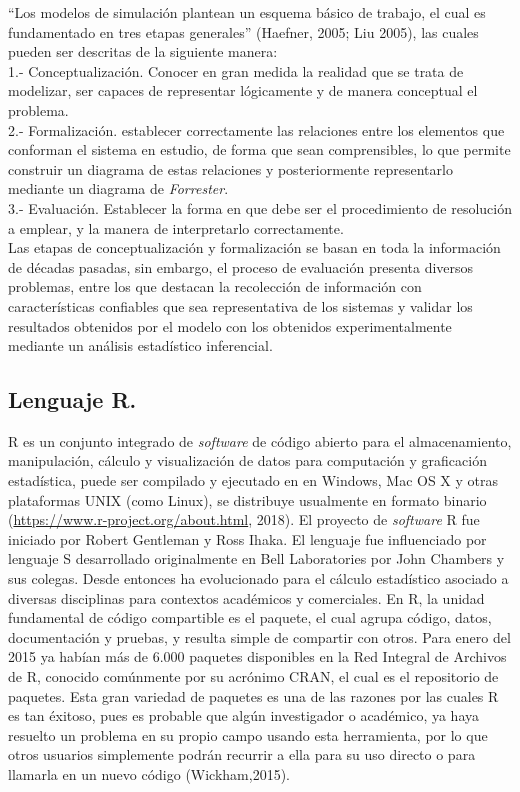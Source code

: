 ``Los modelos de simulaci\'on plantean un esquema b\'asico de trabajo, el cual es fundamentado en tres etapas generales'' (Haefner, 2005; Liu 2005), las cuales pueden ser descritas de la siguiente manera:\\

1.- Conceptualizaci\'on. Conocer en gran medida la realidad que se trata de modelizar, ser capaces de representar l\'ogicamente y de manera conceptual el problema. \\

2.- Formalizaci\'on. establecer correctamente las relaciones entre los elementos que conforman el sistema en estudio, de forma que sean comprensibles, lo que permite construir un diagrama de estas relaciones y posteriormente representarlo mediante un diagrama de \textit{Forrester}.\\

3.- Evaluaci\'on. Establecer la forma en que debe ser el procedimiento de resoluci\'on a emplear, y la manera de interpretarlo correctamente.\\


Las etapas de conceptualizaci\'on y formalizaci\'on se basan en toda la informaci\'on de d\'ecadas pasadas, sin embargo, el proceso de evaluaci\'on presenta diversos problemas, entre los que destacan la recolecci\'on de informaci\'on con caracter\'isticas confiables que sea representativa de los sistemas y validar los resultados obtenidos por el modelo con los obtenidos experimentalmente mediante un an\'alisis estad\'istico inferencial.


\subsection{Lenguaje R.}

R es un conjunto  integrado de \textit{software} de c\'odigo abierto para el almacenamiento, manipulaci\'on, c\'alculo y visualizaci\'on de datos para computaci\'on y graficaci\'on estad\'istica, puede ser compilado y ejecutado en  en Windows, Mac OS X y otras  plataformas UNIX (como Linux), se distribuye usualmente en formato binario (\url{https://www.r-project.org/about.html}, 2018). El proyecto de \emph{software} R fue iniciado por Robert Gentleman y Ross Ihaka. El lenguaje fue influenciado por  lenguaje S desarrollado originalmente en Bell Laboratories por John Chambers y sus colegas. Desde entonces ha evolucionado  para el c\'alculo estad\'istico asociado a diversas disciplinas para contextos acad\'emicos y comerciales. En R, la unidad fundamental de c\'odigo compartible es el paquete, el cual agrupa c\'odigo, datos, documentaci\'on y pruebas, y resulta simple de compartir con otros. Para enero del 2015 ya hab\'ian m\'as de 6.000 paquetes disponibles en la Red Integral de Archivos de R, conocido com\'unmente por su acr\'onimo CRAN, el cual es el repositorio de paquetes. Esta gran variedad de paquetes es una de las razones por las cuales R es tan \'exitoso, pues es probable que alg\'un investigador o acad\'emico, ya haya resuelto un problema en su propio campo usando esta herramienta, por lo que otros usuarios simplemente podr\'an recurrir a ella para su uso directo o para llamarla en un nuevo c\'odigo (Wickham,2015). \\


